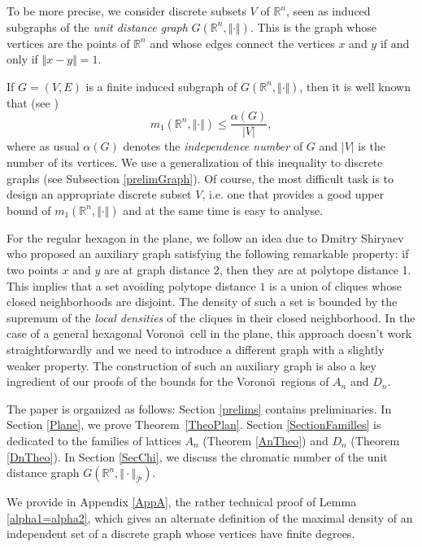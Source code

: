 \documentclass{amsart}                     %
\newcommand{\R}{{\mathbb R}}
\newcommand{\tref}[1]{Theorem~\textup{\ref{#1}}}
\begin{document}
To be more precise, we consider  discrete subsets $V$ of $\R^n$,
seen as induced subgraphs of the \emph{unit distance graph}
$G(\R^n,\Vert \cdot \Vert)$. This is the graph whose vertices are the points of $\R^n$
and whose edges connect the vertices $x$ and $y$ if and only if $\Vert
x-y \Vert=1$. 



If $G=(V,E)$ is a finite induced subgraph of $G(\R^n,\Vert \cdot
\Vert)$, then it is well known that (see \cite{MR0319055})
$$m_1(\R^n,\Vert \cdot \Vert) \leq \frac{\alpha(G)}{|V|}, $$
where as usual $\alpha(G)$ denotes the \textit{independence number} of
$G$ and $|V|$ is the number of its vertices. We use a generalization
of this inequality to discrete graphs (see Subsection
\ref{prelimGraph}). Of course, the most difficult task is to design an
appropriate discrete subset $V$, i.e. one that provides a good
upper bound  of $m_1(\R^n,\Vert \cdot \Vert)$ and at the same time is
easy to analyse.


For the regular hexagon in the plane, we follow an idea due to  Dmitry Shiryaev \cite{Dmitry} 
who proposed an auxiliary graph satisfying the following remarkable property: if two points $x$ and $y$ are at graph distance $2$, then they are at polytope distance 1. This implies that a set avoiding polytope distance $1$ is a union of cliques whose closed neighborhoods are disjoint. The density of such a set is bounded by the supremum of the \textit{local densities} of the cliques in their closed neighborhood. 
In the case of a general hexagonal Vorono\"\i\  cell in the plane, this approach doesn't work straightforwardly and  we need to introduce a different graph with a slightly weaker property.
The construction of such an auxiliary graph is also a key ingredient of our proofs of the bounds for the Vorono\"\i\  regions of $A_n$ and $D_n$. 

The paper is organized as follows: Section \ref{prelims} contains
preliminaries. In Section \ref{Plane}, we prove
\tref{TheoPlan}. Section \ref{SectionFamilles} is dedicated to the
families of lattices  $A_n$ (Theorem \ref{AnTheo}) and $D_n$ (Theorem
\ref{DnTheo}). In Section \ref{SecChi}, we discuss the chromatic
number of the unit distance graph $G(\R^n, \Vert\cdot\Vert_{\mathcal  P})$. 

We provide in Appendix \ref{AppA}, the rather technical proof of Lemma \ref{alpha1=alpha2}, which gives an alternate definition of the maximal density of an independent set of a discrete graph 
whose vertices have finite degrees. 
\end{document}
